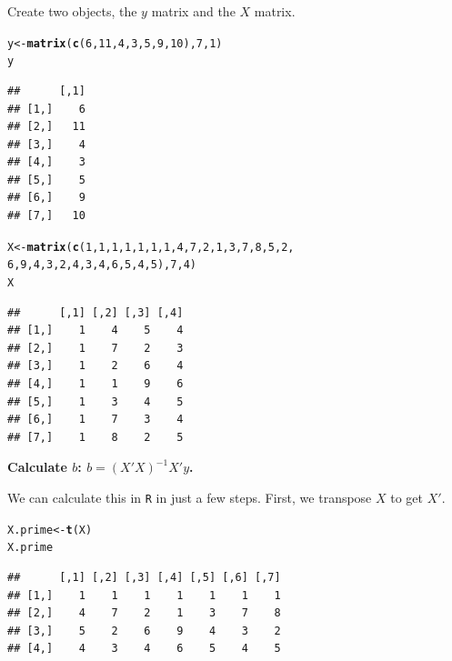 \documentclass[11pt,openany]{book}\usepackage[]{graphicx}\usepackage[]{color}
\makeatletter
\newcommand{\hlnum}[1]{\textcolor[rgb]{0.686,0.059,0.569}{#1}}%
\newcommand{\hlstd}[1]{\textcolor[rgb]{0.345,0.345,0.345}{#1}}%
\newcommand{\hlkwb}[1]{\textcolor[rgb]{0.69,0.353,0.396}{#1}}%
\newcommand{\hlkwd}[1]{\textcolor[rgb]{0.737,0.353,0.396}{\textbf{#1}}}%
\newenvironment{kframe}{%
 \def\at@end@of@kframe{}%
 \ifinner\ifhmode%
  \def\at@end@of@kframe{\end{minipage}}%
  \begin{minipage}{\columnwidth}%
 \fi\fi%
 \def\FrameCommand##1{\hskip\@totalleftmargin \hskip-\fboxsep
 \colorbox{shadecolor}{##1}\hskip-\fboxsep
     \hskip-\linewidth \hskip-\@totalleftmargin \hskip\columnwidth}%
 \MakeFramed {\advance\hsize-\width
   \@totalleftmargin\z@ \linewidth\hsize
   \@setminipage}}%
 {\par\unskip\endMakeFramed%
 \at@end@of@kframe}
\newenvironment{knitrout}{}{} %
\renewenvironment{knitrout}{\begin{singlespace}}{\end{singlespace}}
\makeatother
\begin{document}
\noindent Create two objects, the $y$ matrix and the $X$ matrix. 
\begin{knitrout}
\color{fgcolor}\begin{kframe}
\begin{alltt}
\hlstd{y} \hlkwb{<-} \hlkwd{matrix}\hlstd{(}\hlkwd{c}\hlstd{(}\hlnum{6}\hlstd{,} \hlnum{11}\hlstd{,} \hlnum{4}\hlstd{,} \hlnum{3}\hlstd{,} \hlnum{5}\hlstd{,} \hlnum{9}\hlstd{,} \hlnum{10}\hlstd{),} \hlnum{7}\hlstd{,} \hlnum{1}\hlstd{)}
\hlstd{y}
\end{alltt}
\begin{verbatim}
##      [,1]
## [1,]    6
## [2,]   11
## [3,]    4
## [4,]    3
## [5,]    5
## [6,]    9
## [7,]   10
\end{verbatim}
\begin{alltt}
\hlstd{X} \hlkwb{<-} \hlkwd{matrix}\hlstd{(}\hlkwd{c}\hlstd{(}\hlnum{1}\hlstd{,} \hlnum{1}\hlstd{,} \hlnum{1}\hlstd{,} \hlnum{1}\hlstd{,} \hlnum{1}\hlstd{,} \hlnum{1}\hlstd{,} \hlnum{1}\hlstd{,} \hlnum{4}\hlstd{,} \hlnum{7}\hlstd{,} \hlnum{2}\hlstd{,} \hlnum{1}\hlstd{,} \hlnum{3}\hlstd{,} \hlnum{7}\hlstd{,} \hlnum{8}\hlstd{,} \hlnum{5}\hlstd{,} \hlnum{2}\hlstd{,}
    \hlnum{6}\hlstd{,} \hlnum{9}\hlstd{,} \hlnum{4}\hlstd{,} \hlnum{3}\hlstd{,} \hlnum{2}\hlstd{,} \hlnum{4}\hlstd{,} \hlnum{3}\hlstd{,} \hlnum{4}\hlstd{,} \hlnum{6}\hlstd{,} \hlnum{5}\hlstd{,} \hlnum{4}\hlstd{,} \hlnum{5}\hlstd{),} \hlnum{7}\hlstd{,} \hlnum{4}\hlstd{)}
\hlstd{X}
\end{alltt}
\begin{verbatim}
##      [,1] [,2] [,3] [,4]
## [1,]    1    4    5    4
## [2,]    1    7    2    3
## [3,]    1    2    6    4
## [4,]    1    1    9    6
## [5,]    1    3    4    5
## [6,]    1    7    3    4
## [7,]    1    8    2    5
\end{verbatim}
\end{kframe}
\end{knitrout}

\noindent \textbf{Calculate $b$:
$b = (X'X)^{-1}X'y$.} 

\noindent We can calculate this in \texttt{R} in just a few steps. First, we transpose $X$ to get $X'$. 
\begin{knitrout}
\color{fgcolor}\begin{kframe}
\begin{alltt}
\hlstd{X.prime} \hlkwb{<-} \hlkwd{t}\hlstd{(X)}
\hlstd{X.prime}
\end{alltt}
\begin{verbatim}
##      [,1] [,2] [,3] [,4] [,5] [,6] [,7]
## [1,]    1    1    1    1    1    1    1
## [2,]    4    7    2    1    3    7    8
## [3,]    5    2    6    9    4    3    2
## [4,]    4    3    4    6    5    4    5
\end{verbatim}
\end{kframe}
\end{knitrout}
\end{document}
